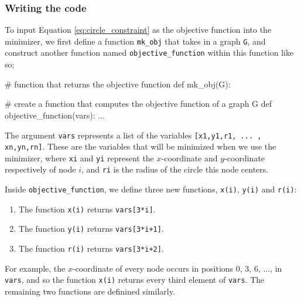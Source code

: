 \subsubsection{Writing the code}

\begin{flushleft}
To input Equation \ref{eq:circle_constraint} as the objective function into the minimizer, we first define a function \texttt{mk\_obj} that takes in a graph \texttt{G}, and construct another function named \texttt{objective\_function} within this function like so;
\end{flushleft}

\begin{code}
    # function that returns the objective function
    def mk_obj(G):
        
        # create a function that computes the objective function of a graph G
        def objective_function(vars):
        ...
\end{code}

\begin{flushleft}
The argument \texttt{vars} represents a list of the variables \texttt{[x1,y1,r1, ... , xn,yn,rn]}. These are the variables that will be minimized when we use the minimizer, where \texttt{xi} and \texttt{yi} represent the $x$-coordinate and $y$-coordinate respectively of node $i$, and \texttt{ri} is the radius of the circle this node centers.
\end{flushleft}

\begin{flushleft}
Inside \texttt{objective\_function}, we define three new functions, \texttt{x(i)}, \texttt{y(i)} and \texttt{r(i)}:

\begin{enumerate}
    \item The function \texttt{x(i)} returns \texttt{vars[3*i]}.
    \vspace{-3mm}
    \item The function \texttt{y(i)} returns \texttt{vars[3*i+1]}.
    \vspace{-3mm}
    \item The function \texttt{r(i)} returns \texttt{vars[3*i+2]}.
\end{enumerate}

For example, the $x$-coordinate of every node occurs in positions 0, 3, 6, ..., in \texttt{vars}, and so the function \texttt{x(i)} returns every third element of \texttt{vars}. The remaining two functions are definined similarly.
\end{flushleft}

